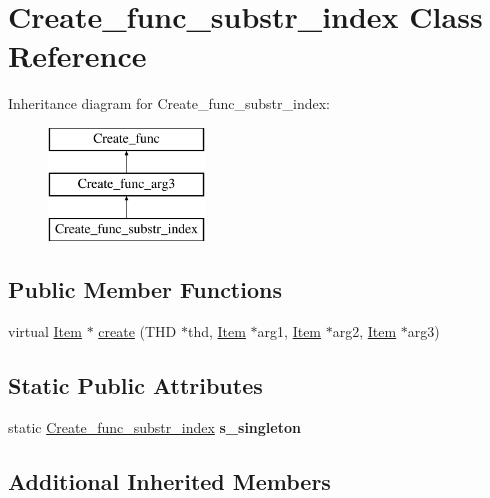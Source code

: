\hypertarget{classCreate__func__substr__index}{}\section{Create\+\_\+func\+\_\+substr\+\_\+index Class Reference}
\label{classCreate__func__substr__index}
Inheritance diagram for Create\+\_\+func\+\_\+substr\+\_\+index\+:\begin{figure}[H]
\begin{center}
\leavevmode
\includegraphics[height=3.000000cm]{classCreate__func__substr__index}
\end{center}
\end{figure}
\subsection*{Public Member Functions}
\begin{DoxyCompactItemize}
\item 
virtual \mbox{\hyperlink{classItem}{Item}} $\ast$ \mbox{\hyperlink{classCreate__func__substr__index_ab0c9d8de76b6dabeb37b965a688033ee}{create}} (T\+HD $\ast$thd, \mbox{\hyperlink{classItem}{Item}} $\ast$arg1, \mbox{\hyperlink{classItem}{Item}} $\ast$arg2, \mbox{\hyperlink{classItem}{Item}} $\ast$arg3)
\end{DoxyCompactItemize}
\subsection*{Static Public Attributes}
\begin{DoxyCompactItemize}
\item 
\mbox{\label{classCreate__func__substr__index_a024506fa8368de558ed76c1a73dd01e9}} 
static \mbox{\hyperlink{classCreate__func__substr__index}{Create\+\_\+func\+\_\+substr\+\_\+index}} {\bfseries s\+\_\+singleton}
\end{DoxyCompactItemize}
\subsection*{Additional Inherited Members}


